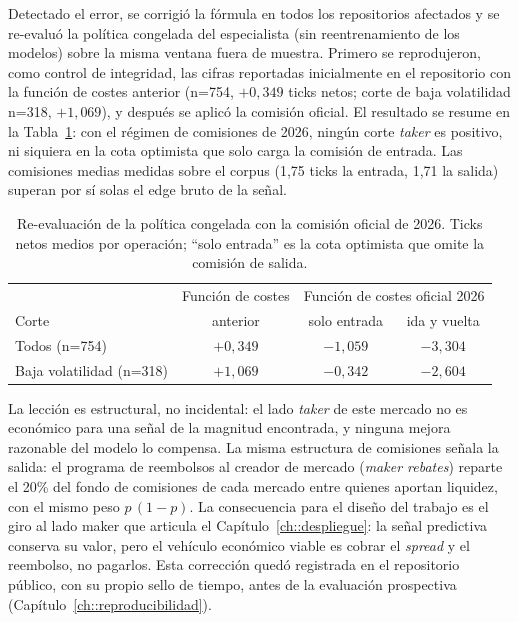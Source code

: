 Detectado el error, se corrigió la fórmula en todos los repositorios afectados y se
re-evaluó la política congelada del especialista (sin reentrenamiento de los modelos) sobre
la misma ventana fuera de muestra. Primero se reprodujeron, como control de integridad, las
cifras reportadas inicialmente en el repositorio con la función de costes anterior (n=754,
$+0{,}349$ ticks netos; corte de baja volatilidad n=318, $+1{,}069$), y después se aplicó
la comisión oficial. El resultado se resume en la Tabla~\ref{tab::fees_antes_despues}: con
el régimen de comisiones de 2026, ningún corte \emph{taker} es positivo, ni siquiera en la
cota optimista que solo carga la comisión de entrada. Las comisiones medias medidas sobre el corpus (1,75 ticks la
entrada, 1,71 la salida) superan por sí solas el edge bruto de la señal.

\begin{table}[htbp]
\centering
\caption{Re-evaluación de la política congelada con la comisión oficial de 2026.
Ticks netos medios por operación; ``solo entrada'' es la cota optimista que omite la
comisión de salida.}
\label{tab::fees_antes_despues}
\begin{tabular}{lccc}
\hline
 & Función de costes & \multicolumn{2}{c}{Función de costes oficial 2026} \\
Corte & anterior & solo entrada & ida y vuelta \\
\hline
Todos (n=754) & $+0{,}349$ & $-1{,}059$ & $-3{,}304$ \\
Baja volatilidad (n=318) & $+1{,}069$ & $-0{,}342$ & $-2{,}604$ \\
\hline
\end{tabular}
\end{table}

La lección es estructural, no incidental: el lado \emph{taker} de este mercado no es
económico para una señal de la magnitud encontrada, y ninguna mejora razonable del
modelo lo compensa. La misma estructura de comisiones señala la salida: el programa
de reembolsos al creador de mercado (\emph{maker rebates}) reparte el 20\% del fondo
de comisiones de cada mercado entre quienes aportan liquidez, con el mismo peso
$p\,(1-p)$. La consecuencia para el diseño del trabajo es el giro al lado maker que
articula el Capítulo~\ref{ch::despliegue}: la señal predictiva conserva su valor,
pero el vehículo económico viable es cobrar el \emph{spread} y el reembolso, no
pagarlos. Esta corrección quedó registrada en el repositorio público, con su propio sello
de tiempo, antes de la evaluación prospectiva (Capítulo~\ref{ch::reproducibilidad}).

